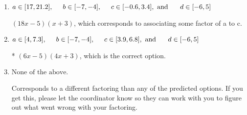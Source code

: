\documentclass{extbook}[14pt]
\begin{document}
\begin{enumerate}
{\begin{enumerate}[label=\Alph*.]
 $(3x -5)(8x + 3)$, which corresponds to associating some factor of c to a.
\item \( a \in [17, 21.2], \hspace*{5mm} b \in [-7, -4], \hspace*{5mm} c \in [-0.6, 3.4], \text{ and } \hspace*{5mm} d \in [-6, 5] \)

 $(18x -5)(x + 3)$, which corresponds to associating some factor of a to c.
\item \( a \in [4, 7.3], \hspace*{5mm} b \in [-7, -4], \hspace*{5mm} c \in [3.9, 6.8], \text{ and } \hspace*{5mm} d \in [-6, 5] \)

* $(6x -5)(4x + 3)$, which is the correct option.
\item \( \text{None of the above.} \)

 Corresponds to a different factoring than any of the predicted options. If you get this, please let the coordinator know so they can work with you to figure out what went wrong with your factoring.
\end{enumerate}

}
\end{enumerate}
\end{document}
